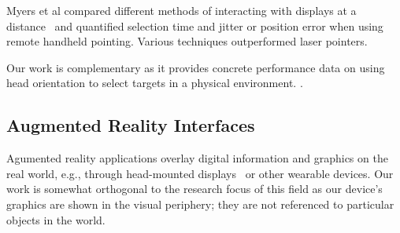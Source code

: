 Myers et al compared different methods of interacting with displays at a distance~\cite{myers_interacting_2002} and quantified selection time and jitter or position error when using remote handheld pointing. Various techniques outperformed laser pointers.

Our work is complementary as it provides concrete performance data on using head orientation to select targets in a physical environment.
.

\subsection{Augmented Reality Interfaces}
Agumented reality applications overlay digital information and graphics on the real world, e.g., through head-mounted displays~\cite{azuma_recent_2001} or other wearable devices. 
Our work is somewhat orthogonal to the research focus of this field as our device's graphics are shown in the visual periphery; they are not referenced to particular objects in the world.

